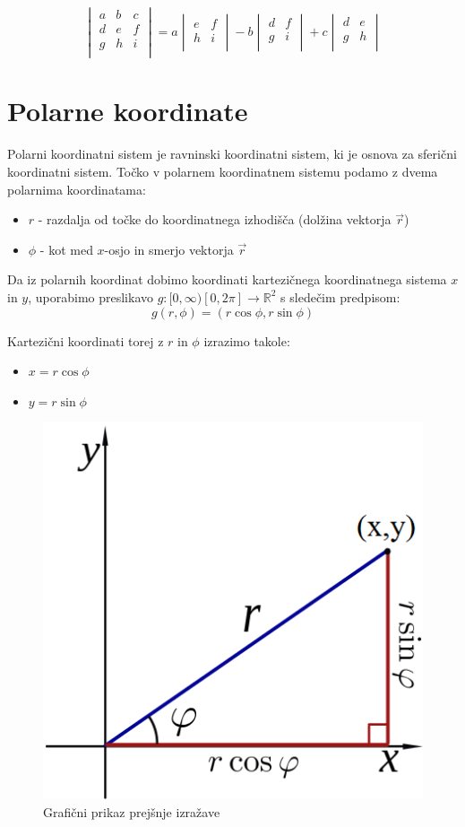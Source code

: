 \documentclass[12pt, a4paper]{article}
\begin{document}
\[
\begin{vmatrix}
 a&b&c\\
 d&e&f\\
 g&h&i\\
\end{vmatrix}
=a\begin{vmatrix}
e&f\\
h&i\\
\end{vmatrix}-b\begin{vmatrix}
d&f\\
g&i\\
\end{vmatrix}+c\begin{vmatrix}
d&e\\
g&h\\
\end{vmatrix}
\]




\section{Polarne koordinate}
Polarni koordinatni sistem je ravninski koordinatni sistem, ki je osnova za sferični koordinatni sistem. Točko v polarnem koordinatnem sistemu podamo z dvema polarnima koordinatama:
\begin{itemize}
\item $r$ - razdalja od točke do koordinatnega izhodišča (dolžina vektorja $\vec{r}$)
\item $\phi$ - kot med $x$-osjo in smerjo vektorja $\vec{r}$
\end{itemize}

Da iz polarnih koordinat dobimo koordinati kartezičnega koordinatnega sistema $x$ in $y$, uporabimo preslikavo $g:[ 0,\infty)    [0,2\pi]  \rightarrow  \mathbb{R}^2$ s sledečim predpisom:
$$g(r,\phi) = (r \cos \phi, r \sin \phi)$$

Kartezični koordinati torej z $r$ in $\phi$ izrazimo takole:
\begin{itemize}
\item $x=r \cos \phi$
\item $y=r \sin \phi$
\end{itemize}

\begin{figure}[h!]
\centering
\includegraphics[width=.3\textwidth]{polarne_koordinate.png}
\caption{Grafični prikaz prejšnje izražave}
\end{figure}
\end{document}
